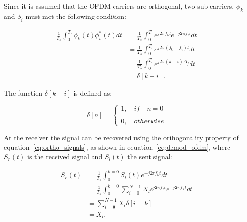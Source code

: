 Since it is assumed that the OFDM carriers are orthogonal, two sub-carriers, $\phi_{k}$ and $\phi_{i}$ must met the following condition:


\begin{align}
  \frac{1}{T_s} \int_{0}^{T_s} \phi_{k}(t) \phi_{i}^{*}(t) dt & = \frac{1}{T_s} \int_{0}^{T_s} e^{j2\pi f_kt} e^{-j2\pi f_it} dt   \nonumber \\   
  & =  \frac{1}{T_s} \int_{0}^{T_s} e^{j2\pi (f_k - f_i)t} dt    \nonumber \\
  & =  \frac{1}{T_s} \int_{0}^{T_s} e^{j2\pi (k-i)\Delta_f}  dt  \nonumber \\
  & =   \delta[k-i].
\label{eq:ortho_signals}
\end{align}



The function $\delta[k-i]$ is defined as:


\begin{equation}
\delta[n] = 
\begin{cases}
1, \quad if \quad n = 0\\
 \\
0, \quad otherwise
\end{cases}
\end{equation}

At the receiver the signal can be recovered using the orthogonality property of equation~\ref{eq:ortho_signals}, as shown in equation~\ref{eq:demod_ofdm}, where $S_r(t)$ is the received signal and $S_l(t)$ the sent signal: 

\begin{align}
S_r(t) & = \frac{1}{T_s} \int_{0}^{k = 0} S_l(t)e^{-j2\pi f_kt} dt \\
 & = \frac{1}{T_s} \int_{0}^{k = 0} \sum_{i = 0}^{N-1}X_le^{j2\pi f_it}e^{-j2\pi f_kt} dt \nonumber \\ 
 & = \sum_{i = 0}^{N-1}X_l\delta[i - k] \nonumber \\ 
 & = X_l . \nonumber \\ 
\label{eq:demod_ofdm}
\end{align}


